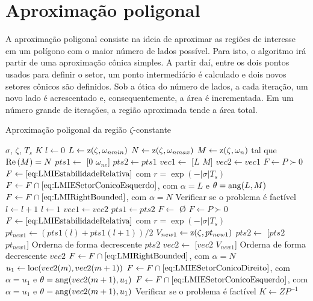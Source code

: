 \section{Aproximação poligonal}
A aproximação poligonal consiste na ideia de aproximar as regiões de interesse em um polígono com o maior número de lados possível. Para isto, o algoritmo irá partir de uma aproximação cônica simples. A partir daí, entre os dois pontos usados para definir o setor, um ponto intermediário é calculado e dois novos setores cônicos são definidos.
Sob a ótica do número de lados, a cada iteração, um novo lado é acrescentado e, consequentemente, a área é incrementada. Em um número grande de iterações, a região aproximada tende a área total.
\begin{algorithm}[ht!]
\caption{Aproximação poligonal da região $\zeta$-constante}\label{alg:AproximacaoPoligonalZeta}
\begin{algorithmic}[1]
\Require $\sigma$, $\zeta$, $T_s$
\Ensure $K$
\State $l \gets 0$
\State $L \gets \operatorname{\mathrm{z}}(\zeta,\omega_{nmin})$
\State $N \gets \operatorname{\mathrm{z}}(\zeta,\omega_{nmax})$
\State $M \gets \operatorname{\mathrm{z}}(\zeta,\omega_n)$ tal que $\operatorname{Re}{(M)} = N$
\State $pts1 \gets$ [$0$ $\omega_{ne}$]
\State $pts2 \gets pts1$
\State $vec1 \gets$ [$L$ $M$]
\State $vec2 \gets vec1$
\State $F \gets P \succ 0$
\State $F \gets \eqref{eq:LMIEstabilidadeRelativa}$ com $r = \exp{\left(-|\sigma|T_s\right)}$ 
\State $F \gets F \cap \eqref{eq:LMIESetorConicoEsquerdo}$, com $\alpha = L$ e $\theta = \operatorname{ang}(L,M)$ 
\State $F \gets F \cap \eqref{eq:LMIRightBounded}$, com $\alpha = N$ 
\State Verificar se o problema é factível
\State $l \gets l + 1$
\Else
\State $l \gets 1$
\State $vec1 \gets vec2$
\State $pts1 \gets pts2$
\EndIf
\State $F \gets$ \O {}
\State $F \gets P \succ 0$
\State $F \gets \eqref{eq:LMIEstabilidadeRelativa}$ com $r = \exp{\left(-|\sigma|T_s\right)}$ 
\State $pt_{new1} \gets (pts1(l)+pts1(l+1))/2$
\State $V_{new1} \gets \operatorname{\mathrm{z}}(\zeta, pt_{new1})$
\State $pts2 \gets$ [$pts2$ $pt_{new1}$]
\State Orderna de forma decrescente $pts2$
\State $vec2 \gets$ [$vec2$ $V_{new1}$]
\State Orderna de forma decrescente $vec2$
\State $F \gets F \cap \eqref{eq:LMIRightBounded}$, com $\alpha = N$ 
\State $u_1 \gets \operatorname{loc}(vec2(m),vec2(m+1))$
\State $F\gets F \cap \eqref{eq:LMIESetorConicoDireito}$, com $\alpha = u_1$ e $\theta = \operatorname{ang}(vec2(m+1),u_1)$ 
\Else
\State $F\gets F \cap \eqref{eq:LMIESetorConicoEsquerdo}$, com $\alpha = u_1$ e $\theta = \operatorname{ang}(vec2(m+1),u_1)$ 
\EndIf
\EndFor
\State Verificar se o problema é factível
\EndWhile
\State $K \gets ZP^{-1}$
\end{algorithmic}
\end{algorithm}

